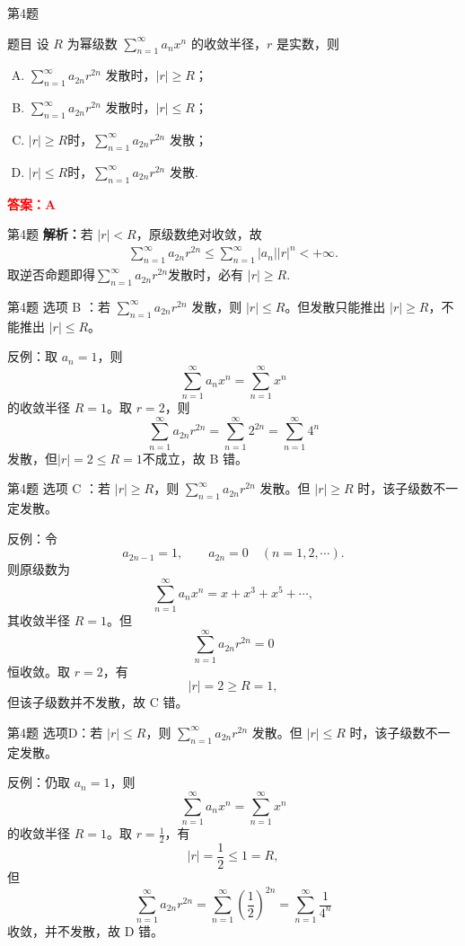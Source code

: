 \documentclass[aspectratio=169]{beamer}
\begin{document}
\begin{frame}{第4题}
\begin{block}{题目}
设 $R$ 为幂级数 $\sum_{n=1}^{\infty} a_n x^n$ 的收敛半径，$r$ 是实数，则
\begin{enumerate}[A.]
\item $\sum_{n=1}^{\infty} a_{2n}r^{2n}$ 发散时，$|r|\geqslant R$；
\item $\sum_{n=1}^{\infty} a_{2n}r^{2n}$ 发散时，$|r|\leqslant R$；
\item $ |r|\geqslant R$时，$\sum_{n=1}^{\infty} a_{2n}r^{2n}$ 发散；
\item $ |r|\leqslant R$时，$\sum_{n=1}^{\infty} a_{2n}r^{2n}$ 发散.
\end{enumerate}
\end{block}
\textcolor{red}{\textbf{答案：}$\mathbf{A}$}
\end{frame}

\begin{frame}{第4题}
\textbf{解析：}若 $|r|<R$，原级数绝对收敛，故
\begin{align*}
\sum_{n=1}^{\infty} a_{2n}r^{2n}\leqslant \sum_{n=1}^{\infty} |a_{n}||r|^{n}<+\infty.
\end{align*}
取逆否命题即得$\sum_{n=1}^{\infty} a_{2n}r^{2n}$发散时，必有 $|r|\geqslant R$.
\end{frame}

\begin{frame}{第4题}
选项 B ：若 \(\sum_{n=1}^{\infty} a_{2n}r^{2n}\) 发散，则 \(|r|\le R\)。但发散只能推出 \(|r|\ge R\)，不能推出 \(|r|\le R\)。

反例：取 \(a_n=1\)，则
\[
\sum_{n=1}^{\infty} a_nx^n=\sum_{n=1}^{\infty}x^n
\]
的收敛半径 \(R=1\)。取 \(r=2\)，则
\[
\sum_{n=1}^{\infty} a_{2n}r^{2n}
=\sum_{n=1}^{\infty}2^{2n}
=\sum_{n=1}^{\infty}4^n
\]
发散，但$|r|=2\leqslant R=1$不成立，故 B 错。
\end{frame}

\begin{frame}{第4题}
选项 C ：若 \(|r|\geqslant R\)，则 \(\sum_{n=1}^{\infty} a_{2n}r^{2n}\) 发散。但 \(|r|\geqslant R\) 时，该子级数不一定发散。

反例：令
\[
a_{2n-1}=1,\qquad a_{2n}=0\quad(n=1,2,\cdots).
\]
则原级数为
\[
\sum_{n=1}^{\infty}a_nx^n=x+x^3+x^5+\cdots,
\]
其收敛半径 \(R=1\)。但
\[
\sum_{n=1}^{\infty}a_{2n}r^{2n}=0
\]
恒收敛。取 \(r=2\)，有
\[
|r|=2\geqslant R=1,
\]
但该子级数并不发散，故 C 错。
\end{frame}

\begin{frame}{第4题}
选项D：若 \(|r|\leqslant R\)，则 \(\sum_{n=1}^{\infty} a_{2n}r^{2n}\) 发散。但 \(|r|\leqslant R\) 时，该子级数不一定发散。

反例：仍取 \(a_n=1\)，则
\[
\sum_{n=1}^{\infty}a_nx^n=\sum_{n=1}^{\infty}x^n
\]
的收敛半径 \(R=1\)。取 \(r=\frac12\)，有
\[
|r|=\frac12\leqslant 1=R,
\]
但
\[
\sum_{n=1}^{\infty}a_{2n}r^{2n}
=\sum_{n=1}^{\infty}\left(\frac12\right)^{2n}
=\sum_{n=1}^{\infty}\frac1{4^n}
\]
收敛，并不发散，故 D 错。
\end{frame}
\end{document}
